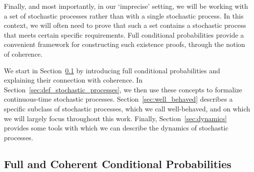 \documentclass[10pt,a4paper]{paper}
\theoremstyle{definition}
\begin{document}
Finally, and most importantly, in our `imprecise' setting, we will be working with a set of stochastic processes rather than with a single stochastic process. In this context, we will often need to prove that such a set contains a stochastic process that meets certain specific requirements.
Full conditional probabilities provide a convenient framework for constructing such existence proofs, through the notion of coherence.

We start in Section~\ref{sec:cond_prob} by introducing full conditional probabilities and explaining their connection with coherence. In Section~\ref{sec:def_stochastic_processes}, we then use these concepts to formalize continuous-time stochastic processes. Section~\ref{sec:well_behaved} describes a specific subclass of stochastic processes, which we call well-behaved, and on which we will largely focus throughout this work. Finally, Section~\ref{sec:dynamics} provides some tools with which we can describe the dynamics of stochastic processes.

\subsection{Full and Coherent Conditional Probabilities}\label{sec:cond_prob}

\end{document}
